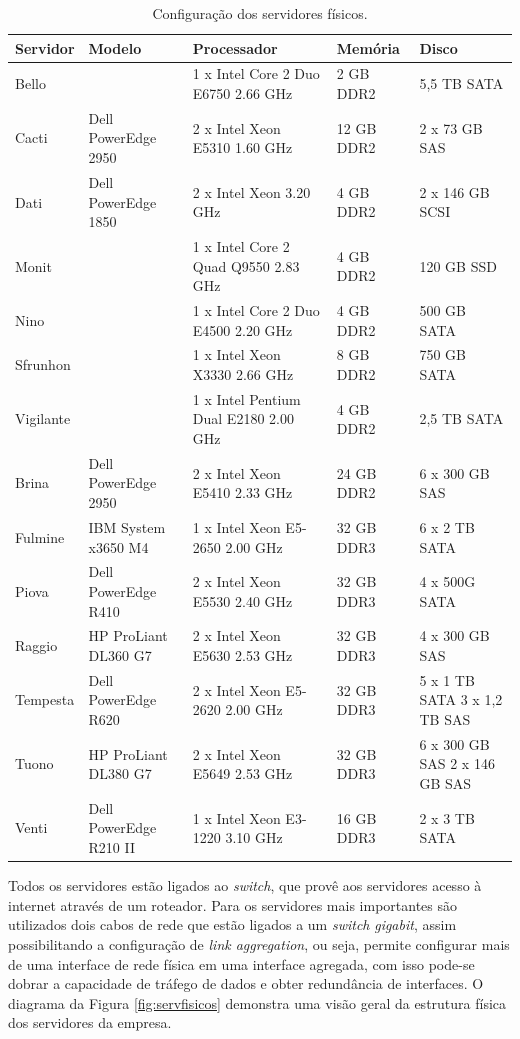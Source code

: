 \begin{table}[h!]
\caption{Configuração dos servidores físicos.}
\label{tab:servfisicos}
\begin{center}
\def\arraystretch{1}
\setlength{\tabcolsep}{0.15cm}
\begin{tabular}{|l|l|p{5.1cm}|l|p{2.1cm}|}\hline
Servidor & Modelo & Processador & Memória & Disco\\\hline
Bello & & 1 x Intel Core 2 Duo E6750 2.66 GHz & 2 GB DDR2 & 5,5 TB SATA\\\hline
Cacti & Dell PowerEdge 2950 & 2 x Intel Xeon E5310 1.60 GHz & 12 GB DDR2 & 2 x 73 GB SAS\\\hline
Dati & Dell PowerEdge 1850 & 2 x Intel Xeon 3.20 GHz & 4 GB DDR2 & 2 x 146 GB SCSI\\\hline
Monit & & 1 x Intel Core 2 Quad Q9550 2.83 GHz & 4 GB DDR2 & 120 GB SSD\\\hline
Nino & & 1 x Intel Core 2 Duo E4500 2.20 GHz & 4 GB DDR2 & 500 GB SATA\\\hline
Sfrunhon & & 1 x Intel Xeon X3330 2.66 GHz & 8 GB DDR2 & 750 GB SATA\\\hline
Vigilante & & 1 x Intel Pentium Dual E2180 2.00 GHz & 4 GB DDR2 & 2,5 TB SATA\\\hline
Brina & Dell PowerEdge 2950 & 2 x Intel Xeon E5410 2.33 GHz & 24 GB DDR2 & 6 x 300 GB SAS\\\hline
Fulmine & IBM System x3650 M4 & 1 x Intel Xeon E5-2650 2.00 GHz & 32 GB DDR3 & 6 x 2 TB SATA\\\hline
Piova & Dell PowerEdge R410 & 2 x Intel Xeon E5530 2.40 GHz & 32 GB DDR3 & 4 x 500G SATA\\\hline
Raggio & HP ProLiant DL360 G7 & 2 x  Intel Xeon E5630 2.53 GHz & 32 GB DDR3 & 4 x 300 GB SAS\\\hline
Tempesta & Dell PowerEdge R620 & 2 x Intel Xeon E5-2620 2.00 GHz & 32 GB DDR3 & 5 x 1 TB SATA 3 x 1,2 TB SAS\\\hline
Tuono & HP ProLiant DL380 G7 & 2 x Intel Xeon E5649 2.53 GHz & 32 GB DDR3 & 6 x 300 GB SAS 2 x 146 GB SAS\\\hline
Venti & Dell PowerEdge R210 II & 1 x Intel Xeon E3-1220 3.10 GHz & 16 GB DDR3 & 2 x 3 TB SATA\\\hline
\end{tabular}
\end{center}
\end{table}

Todos os servidores estão ligados ao \textit{switch}, que provê aos servidores acesso à internet através de um roteador. Para os servidores 
mais importantes são utilizados dois cabos de rede que estão ligados a um \textit{switch} \textit{gigabit}, assim possibilitando
a configuração de \textit{link aggregation}, ou seja, permite configurar mais de uma interface de rede física em uma interface agregada, com isso 
pode-se dobrar a capacidade de tráfego de dados e obter redundância de interfaces. 
O diagrama da Figura \ref{fig:servfisicos} demonstra uma visão geral da estrutura física dos servidores da empresa. 

